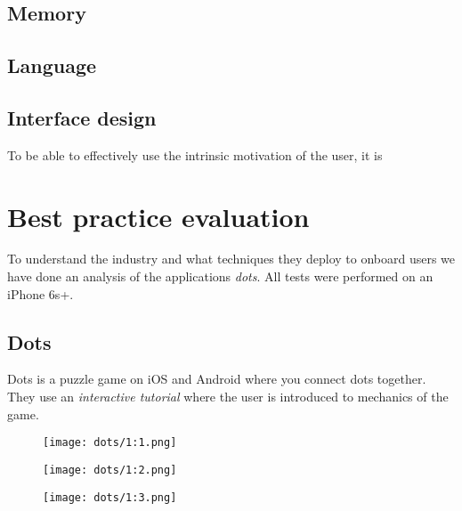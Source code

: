 {\subsection{Memory}
\subsection{Language}
\subsection{Interface design}
To be able to effectively use the intrinsic motivation of the user, it is
}

\section{Best practice evaluation}
\label{sec:best_practice_evaluation}

To understand the industry and what techniques they deploy to onboard users we have done an analysis of the applications \textit{dots}. All tests were performed on an iPhone 6s+.

\subsection{Dots}

Dots is a puzzle game on iOS and Android where you connect dots together. They use an \textit{interactive tutorial} where the user is introduced to mechanics of the game.

\begin{figure}
\centering
\captionsetup{format=multiline,font=footnotesize}
\begin{minipage}{.33333\textwidth}
  \centering
  \texttt{[image: dots/1:1.png]}
  \label{fig:1:1}
\end{minipage}%
\begin{minipage}{.33333\textwidth}
  \centering
  \texttt{[image: dots/1:2.png]}
  \label{fig:1:2}
\end{minipage}%
\begin{minipage}{.33333\textwidth}
  \centering
  \texttt{[image: dots/1:3.png]}
  \label{fig:1:3}
\end{minipage}
\end{figure}

